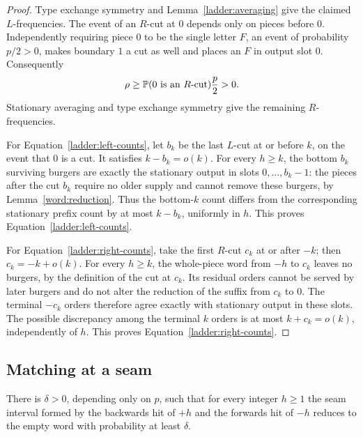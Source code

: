 \begin{proof}
Type exchange symmetry and Lemma~\ref{ladder:averaging} give the claimed
$L$-frequencies.
The event of an $R$-cut at $0$ depends only on pieces before $0$.
Independently requiring piece $0$ to be the single letter $F$, an event
of probability $p/2>0$, makes boundary $1$ a cut as well and places an
$F$ in output slot $0$.
Consequently
\[
 \rho\ge\P(0\text{ is an }R\text{-cut})\frac p2>0.
\]
Stationary averaging and type exchange symmetry give the remaining
$R$-frequencies.

For Equation~\eqref{ladder:left-counts}, let $b_k$ be the last $L$-cut
at or before $k$, on the event that $0$ is a cut.
It satisfies $k-b_k=o(k)$.
For every $h\ge k$, the bottom $b_k$ surviving burgers are exactly the
stationary output in slots $0,\ldots,b_k-1$:
the pieces after the cut $b_k$ require no older supply and cannot remove
these burgers, by Lemma~\ref{word:reduction}.
Thus the bottom-$k$ count differs from the corresponding stationary
prefix count by at most $k-b_k$, uniformly in $h$.
This proves Equation~\eqref{ladder:left-counts}.

For Equation~\eqref{ladder:right-counts}, take the first $R$-cut $c_k$
at or after $-k$; then $c_k=-k+o(k)$.
For every $h\ge k$, the whole-piece word from $-h$ to $c_k$ leaves no
burgers, by the definition of the cut at $c_k$.
Its residual orders cannot be served by later burgers and do not alter
the reduction of the suffix from $c_k$ to $0$.
The terminal $-c_k$ orders therefore agree exactly with stationary output
in these slots.
The possible discrepancy among the terminal $k$ orders is at most
$k+c_k=o(k)$, independently of $h$.
This proves Equation~\eqref{ladder:right-counts}.
\end{proof}

\subsection{Matching at a seam}

\begin{proposition}
\label{ladder:uniform}
There is $\delta>0$, depending only on $p$, such that for every integer
$h\ge1$ the seam interval formed by the backwards hit of $+h$ and the
forwards hit of $-h$ reduces to the empty word with probability at least
$\delta$.
\end{proposition}


